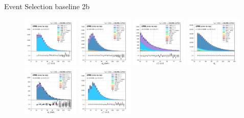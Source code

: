 \begin{frame}{Event Selection  baseline 2b}
    \begin{figure}
        \centering
        \includegraphics[width=0.24\textwidth]{chapters/Analysis/sectionPlots/figures/kinematics_pickles/emu/2b/emu_2b_lepton2_pt.pdf}
        \includegraphics[width=0.24\textwidth]{chapters/Analysis/sectionPlots/figures/kinematics_pickles/mumu/2b/mumu_2b_lepton2_pt.pdf}
        \includegraphics[width=0.24\textwidth]{chapters/Analysis/sectionPlots/figures/kinematics_pickles/mutau/2b/mutau_2b_lepton2_pt.pdf}
        \includegraphics[width=0.24\textwidth]{chapters/Analysis/sectionPlots/figures/kinematics_pickles/mu4j/2b/mu4j_2b_lepton1_pt.pdf}
        \includegraphics[width=0.24\textwidth]{chapters/Analysis/sectionPlots/figures/kinematics_pickles/ee/2b/ee_2b_lepton2_pt.pdf}
        \includegraphics[width=0.24\textwidth]{chapters/Analysis/sectionPlots/figures/kinematics_pickles/emu2/2b/emu2_2b_lepton1_pt.pdf}

\end{figure}
\end{frame}
